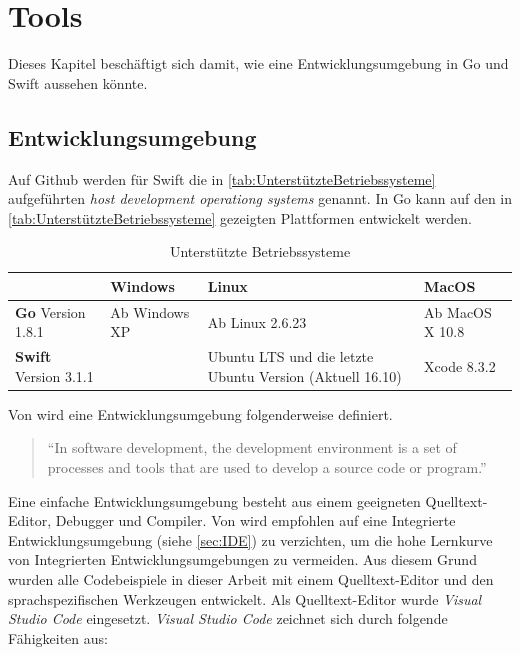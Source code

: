 \chapter{Tools}
Dieses Kapitel beschäftigt sich damit, wie eine Entwicklungsumgebung in Go und Swift aussehen könnte. 


\section{Entwicklungsumgebung}
Auf Github \cite[]{Github.Swift} werden für Swift die in \autoref{tab:UnterstützteBetriebssysteme} aufgeführten \textit{host development operationg systems} genannt.
In Go kann auf den in \autoref{tab:UnterstützteBetriebssysteme} gezeigten Plattformen entwickelt werden.

\begin{table}[H]
    \centering
    \begin{tabularx}{\textwidth}{ |X|X|X|X| }
    \hline 
    \rowcolor[gray]{0.75} \cellcolor{white} & \textbf{Windows} & \textbf{Linux} & \textbf{MacOS} \\
    \hline
    \cellcolor{Gray} \textbf{Go} Version 1.8.1 & Ab Windows XP & Ab Linux 2.6.23 & Ab MacOS X 10.8 \\
    \hline
    \cellcolor{Gray} \textbf{Swift} Version 3.1.1 &  & Ubuntu LTS und die letzte Ubuntu Version (Aktuell 16.10) & Xcode 8.3.2 \\
    \hline
    \end{tabularx}
    \caption{Unterstützte Betriebssysteme}
    \label{tab:UnterstützteBetriebssysteme}
\end{table}

Von \cite[]{TechnoPedia} wird eine Entwicklungsumgebung folgenderweise definiert.

\begin{quote}
\enquote{In software development, the development environment is a set of processes and tools that are used to develop a source code or program.}\cite[]{TechnoPedia}
\end{quote}

Eine einfache Entwicklungsumgebung besteht aus einem geeigneten Quelltext-Editor, Debugger und Compiler. Von \cite[]{NotUseIde} wird empfohlen auf eine Integrierte Entwicklungsumgebung (siehe \autoref{sec:IDE}) zu verzichten, um die hohe Lernkurve von Integrierten Entwicklungsumgebungen zu vermeiden.
Aus diesem Grund wurden alle Codebeispiele in dieser Arbeit mit einem Quelltext-Editor und den sprachspezifischen Werkzeugen entwickelt.
Als Quelltext-Editor wurde \textit{Visual Studio Code} eingesetzt. 
\textit{Visual Studio Code} zeichnet sich durch folgende Fähigkeiten aus:

